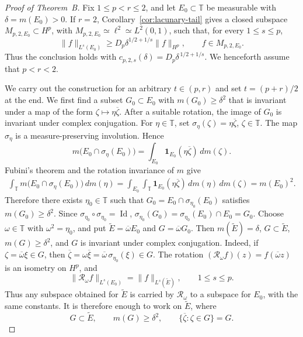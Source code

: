 \documentclass[10pt,a4paper]{amsart}
\newcommand{\T}{\mathbb{T}}
\begin{document}
\begin{proof}[Proof of Theorem~B]
Fix \(1\le p<r\le2\), and let \(E_0\subset\T\) be measurable with
\(\delta=m(E_0)>0\). If \(r=2\),
Corollary~\ref{cor:lacunary-tail} gives a closed subspace
\(M_{p,2,E_0}\subset H^p\), with
\(M_{p,2,E_0}\simeq\ell^2\simeq L^2(0,1)\), such that, for every
\(1\le s\le p\),
\[
        \|f\|_{L^s(E_0)}
        \ge
        D_p\delta^{1/2+1/s}\|f\|_{H^p},
        \qquad
        f\in M_{p,2,E_0}.
\]
Thus the conclusion holds with
\(c_{p,2,s}(\delta)=D_p\delta^{\,1/2+1/s}\).  
We henceforth assume that
\(p<r<2\).

We carry out the construction for an arbitrary \(t\in(p,r)\) and
set \(t=(p+r)/2\) at the end. 
We first find a subset \(G_0\subset E_0\) with
\(m(G_0)\ge\delta^2\) that is invariant under a map of the form
\(\zeta\mapsto\eta\overline{\zeta}\). After a suitable rotation, the
image of \(G_0\) is invariant under complex conjugation. For \(\eta\in\T\), set
\(\sigma_\eta(\zeta)=\eta\overline\zeta\), \(\zeta\in\T\). The map \(\sigma_\eta\) is a measure-preserving involution.  Hence
\[
        m\bigl(E_0\cap\sigma_\eta(E_0)\bigr)
        =
        \int_{E_0}
        \mathbf1_{E_0}(\eta\overline\zeta)\,dm(\zeta).
\]
Fubini's theorem and the rotation invariance of \(m\) give
\[
\begin{aligned}
        \int_\T m\bigl(E_0\cap\sigma_\eta(E_0)\bigr)\,dm(\eta)
        =
        \int_{E_0}\int_\T
        \mathbf1_{E_0}(\eta\overline\zeta)\,dm(\eta)\,dm(\zeta)
        =
        m(E_0)^2.
\end{aligned}
\]
Therefore there exists \(\eta_0\in\T\) such that
\(G_0=E_0\cap\sigma_{\eta_0}(E_0)\) satisfies \(m(G_0)\ge\delta^2\).
Since \(\sigma_{\eta_0}\circ\sigma_{\eta_0}=\operatorname{Id}\),
\(\sigma_{\eta_0}(G_0)
=\sigma_{\eta_0}(E_0)\cap E_0=G_0\).
Choose \(\omega\in\T\) with \(\omega^2=\eta_0\), and put
\(\widetilde E=\overline\omega E_0\) and
\(G=\overline\omega G_0\). Then \(m(\widetilde E)=\delta\), \(G\subset\widetilde E\),
\(m(G)\ge\delta^2\), and \(G\) is invariant under complex conjugation.
Indeed, if \(\zeta=\overline\omega\xi\in G\), then
\(\overline\zeta
=\omega\overline\xi
=\overline\omega\,\sigma_{\eta_0}(\xi)\in G\). The rotation
\((\mathcal R_\omega f)(z)=f(\overline\omega z)\)
is an isometry on \(H^p\), and
\[
        \|\mathcal R_\omega f\|_{L^s(E_0)}
        =
        \|f\|_{L^s(\widetilde E)},
        \qquad
        1\le s\le p.
\]
Thus any subspace obtained for \(\widetilde E\) is carried by
\(\mathcal R_\omega\) to a subspace for \(E_0\), with the same
constants.  It is therefore enough to work on \(\widetilde E\), where
\[
        G\subset\widetilde E,
        \qquad
        m(G)\ge\delta^2,
        \qquad
        \{\overline\zeta:\zeta\in G\}=G.
\]


\end{proof}
\end{document}
